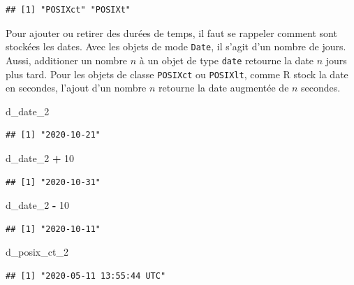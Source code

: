 \documentclass[
  11pt,
]{book}
\newenvironment{Shaded}{\begin{snugshade}}{\end{snugshade}}
\newcommand{\DecValTok}[1]{\textcolor[rgb]{0.00,0.00,0.81}{#1}}
\newcommand{\NormalTok}[1]{#1}
\newcommand{\OperatorTok}[1]{\textcolor[rgb]{0.81,0.36,0.00}{\textbf{#1}}}
\newcommand{\StringTok}[1]{\textcolor[rgb]{0.31,0.60,0.02}{#1}}
\numberwithin{equation}{section}
\numberwithin{countremarque}{section}
\begin{document}
\begin{lstlisting}
## [1] "POSIXct" "POSIXt"
\end{lstlisting}

Pour ajouter ou retirer des durées de temps, il faut se rappeler comment sont stockées les dates. Avec les objets de mode \texttt{Date}, il s'agit d'un nombre de jours. Aussi, additioner un nombre \(n\) à un objet de type \texttt{date} retourne la date \(n\) jours plus tard. Pour les objets de classe \texttt{POSIXct} ou \texttt{POSIXlt}, comme R stock la date en secondes, l'ajout d'un nombre \(n\) retourne la date augmentée de \(n\) secondes.

\begin{Shaded}
\begin{Highlighting}[]
\NormalTok{d\_date\_}\DecValTok{2}
\end{Highlighting}
\end{Shaded}

\begin{lstlisting}
## [1] "2020-10-21"
\end{lstlisting}

\begin{Shaded}
\begin{Highlighting}[]
\NormalTok{d\_date\_}\DecValTok{2} \OperatorTok{+}\StringTok{ }\DecValTok{10}
\end{Highlighting}
\end{Shaded}

\begin{lstlisting}
## [1] "2020-10-31"
\end{lstlisting}

\begin{Shaded}
\begin{Highlighting}[]
\NormalTok{d\_date\_}\DecValTok{2} \OperatorTok{{-}}\StringTok{ }\DecValTok{10}
\end{Highlighting}
\end{Shaded}

\begin{lstlisting}
## [1] "2020-10-11"
\end{lstlisting}

\begin{Shaded}
\begin{Highlighting}[]
\NormalTok{d\_posix\_ct\_}\DecValTok{2}
\end{Highlighting}
\end{Shaded}

\begin{lstlisting}
## [1] "2020-05-11 13:55:44 UTC"
\end{lstlisting}
\end{document}
